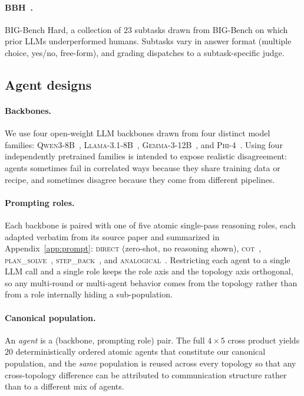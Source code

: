 \paragraph{BBH~\citep{suzgun2022challengingbigbenchtaskschainofthought}.}
BIG-Bench Hard, a collection of $23$ subtasks drawn from BIG-Bench
on which prior LLMs underperformed humans. Subtasks vary in answer
format (multiple choice, yes/no, free-form), and grading dispatches
to a subtask-specific judge.

\subsection{Agent designs}
\paragraph{Backbones.}
We use four open-weight LLM backbones drawn from four distinct
model families: \textsc{Qwen3-8B}~\citep{qwen2025qwen25}, \textsc{Llama-3.1-8B}~\citep{meta2024llama3}, \textsc{Gemma-3-12B}~\citep{gemma_2025}, and \textsc{Phi-4}~\citep{phi_2024}. Using four independently pretrained families is intended to expose realistic disagreement: agents sometimes fail in correlated ways because they share training data or recipe, and sometimes disagree because they come from different pipelines.

\paragraph{Prompting roles.}
Each backbone is paired with one of five atomic single-pass
reasoning roles, each adapted verbatim from its source paper and summarized in Appendix~\ref{app:prompt}:
\textsc{direct} (zero-shot, no reasoning shown),
\textsc{cot}~\citep{wei2023chainofthoughtpromptingelicitsreasoning},
\textsc{plan\_solve}~\citep{wang2023planandsolvepromptingimprovingzeroshot},
\textsc{step\_back}~\citep{zheng2024stepbackevokingreasoning}, and
\textsc{analogical}~\citep{yasunaga2024largelanguagemodelsanalogical}. Restricting each agent to a single LLM call and a single role keeps the role axis and the topology axis orthogonal, so any multi-round or multi-agent behavior comes from the topology rather than from a role internally hiding a sub-population.

\paragraph{Canonical population.}
An \emph{agent} is a (backbone, prompting role) pair. The full
$4 \times 5$ cross product yields $20$ deterministically ordered atomic agents that constitute our canonical population, and the \emph{same} population is reused across every topology so that any cross-topology difference can be attributed to communication structure rather than to a different mix of agents.

